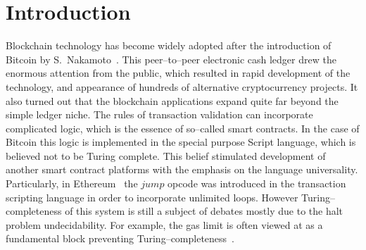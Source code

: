 \documentclass[runningheads]{llncs}
\begin{document}
    \section{Introduction}
    Blockchain technology has become widely adopted after the introduction of
    Bitcoin by S.~Nakamoto~\cite{nakamoto2008bitcoin}. This peer--to--peer
    electronic cash ledger drew the enormous attention from the public, which
    resulted in rapid development of the technology, and appearance of hundreds
    of alternative cryptocurrency projects. It also turned out that the
    blockchain applications expand quite far beyond the simple ledger niche. The
    rules of transaction validation can incorporate complicated logic, which is
    the essence of so--called smart contracts. In the case of Bitcoin this logic
    is implemented in the special purpose Script language, which is believed not
    to be Turing complete. This belief stimulated development of another smart
    contract platforms with the emphasis on the language universality.
    Particularly, in Ethereum~\cite{buterin2014next} the $jump$ opcode was
    introduced in the transaction scripting language in order to incorporate
    unlimited loops. However Turing--completeness of this system is still a
    subject of debates mostly due to the halt problem undecidability.  For
    example, the gas limit is often viewed at as a fundamental block preventing
    Turing--completeness~\cite{miller2016ethereum}.
\end{document}
